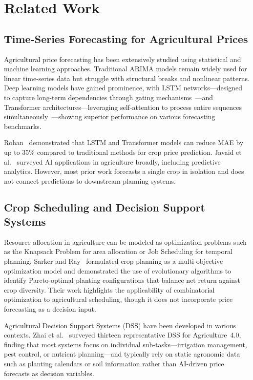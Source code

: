 \documentclass[conference]{IEEEtran}
\begin{document}
\section{Related Work}

\subsection{Time-Series Forecasting for Agricultural Prices}

Agricultural price forecasting has been extensively studied using statistical and machine learning approaches. Traditional ARIMA models remain widely used for linear time-series data but struggle with structural breaks and nonlinear patterns. Deep learning models have gained prominence, with LSTM networks---designed to capture long-term dependencies through gating mechanisms~\cite{hochreiter1997lstm}---and Transformer architectures---leveraging self-attention to process entire sequences simultaneously~\cite{vaswani2017attention}---showing superior performance on various forecasting benchmarks.

Rohan~\cite{rohan2025crop} demonstrated that LSTM and Transformer models can reduce MAE by up to 35\% compared to traditional methods for crop price prediction. Javaid et al.~\cite{javaid2023ai} surveyed AI applications in agriculture broadly, including predictive analytics. However, most prior work forecasts a single crop in isolation and does not connect predictions to downstream planning systems.

\subsection{Crop Scheduling and Decision Support Systems}

Resource allocation in agriculture can be modeled as optimization problems such as the Knapsack Problem for area allocation or Job Scheduling for temporal planning. Sarker and Ray~\cite{sarker2009crop} formulated crop planning as a multi-objective optimization model and demonstrated the use of evolutionary algorithms to identify Pareto-optimal planting configurations that balance net return against crop diversity. Their work highlights the applicability of combinatorial optimization to agricultural scheduling, though it does not incorporate price forecasting as a decision input.

Agricultural Decision Support Systems (DSS) have been developed in various contexts. Zhai et al.~\cite{zhai2020dss} surveyed thirteen representative DSS for Agriculture~4.0, finding that most systems focus on individual sub-tasks---irrigation management, pest control, or nutrient planning---and typically rely on static agronomic data such as planting calendars or soil information rather than AI-driven price forecasts as decision variables.
\end{document}
